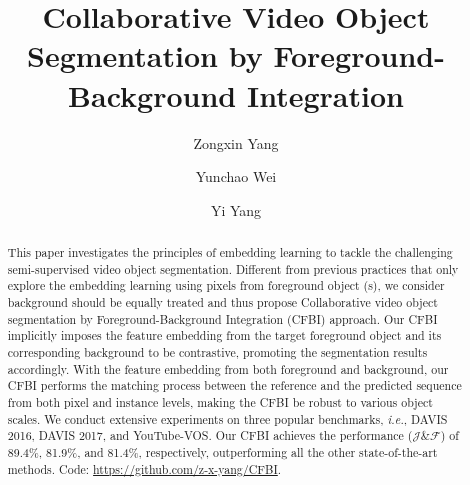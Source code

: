 \documentclass[runningheads]{llncs}
\def\ie{\emph{i.e.}}
\begin{document}
\pagestyle{headings}
\mainmatter
\def\ECCVSubNumber{3385}  

\title{Collaborative Video Object Segmentation by Foreground-Background Integration} 

\begin{comment}
\titlerunning{ECCV-20 submission ID \ECCVSubNumber} 
\authorrunning{ECCV-20 submission ID \ECCVSubNumber} 
\author{Anonymous ECCV submission}
\institute{Paper ID \ECCVSubNumber}
\end{comment}


\author{Zongxin Yang \and
Yunchao Wei \and
Yi Yang}
\maketitle

\renewcommand{\thefootnote}{*}

\setlength{\intextsep}{0pt}

\begin{abstract}
This paper investigates the principles of embedding learning to tackle the challenging semi-supervised video object segmentation.
Different from previous practices that only explore the embedding learning using pixels from foreground object (s), we consider background should be equally treated and thus propose Collaborative video object segmentation by Foreground-Background Integration (CFBI) approach. Our CFBI implicitly imposes the feature embedding from the target foreground object and its corresponding background to be contrastive, promoting the segmentation results accordingly.  With the feature embedding from both foreground and background, our CFBI performs the matching process between the reference and the predicted sequence from both pixel and instance levels,  making the CFBI be robust to various object scales. We conduct extensive experiments on three popular benchmarks, \ie, DAVIS 2016, DAVIS 2017, and YouTube-VOS. Our CFBI achieves the performance ($\mathcal{J}$\&$\mathcal{F}$) of 89.4\%, 81.9\%, and 81.4\%, respectively, outperforming all the other state-of-the-art methods. Code: \url{https://github.com/z-x-yang/CFBI}.


\end{abstract}
\end{document}
